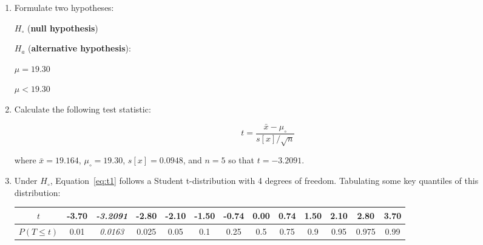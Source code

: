 \begin{enumerate}
\item  Formulate two hypotheses:\\

  \noindent\begin{minipage}{.4\textwidth}
    $H_\circ$ (\textbf{null hypothesis})
    
    \vspace{1em}
    
    $H_a$ (\textbf{alternative hypothesis}):
  \end{minipage}
  \begin{minipage}{.2\textwidth}
  \end{minipage}
  \begin{minipage}{.2\textwidth}
    $\mu=19.30$
    
    \vspace{1em}
    
    $\mu<{19.30}$
  \end{minipage}
  \begin{minipage}{.2\textwidth}
  \end{minipage}
  
\item Calculate the following test statistic:

  \begin{equation}
    t = \frac{\bar{x} - \mu_\circ}{s[x]/\sqrt{n}}
    \label{eq:t1}
  \end{equation}

  \noindent where $\bar{x} = 19.164$, $\mu_\circ = 19.30$, 
  $s[x] = 0.0948$, and $n = 5$ so that $t = -3.2091$.

\item Under $H_\circ$, Equation~\ref{eq:t1} follows a Student
  t-distribution with 4 degrees of freedom. Tabulating some key
  quantiles of this distribution:

  \begin{center}
    \begin{tabular}{c|c@{\gap}c@{\gap}c@{\gap}c@{\gap}
        c@{\gap}c@{\gap}c@{\gap}c@{\gap}c@{\gap}c@{\gap}c@{\gap}c}
      $t$ & -3.70 & \textit{-3.2091} & -2.80 & -2.10 & -1.50 & -0.74 &
      0.00 & 0.74 & 1.50 & 2.10 & 2.80 & 3.70 \\ \hline
      $P(T\leq{t})$ & 0.01 & \textit{0.0163} & 0.025 & 0.05 & 0.1 & 0.25 &
      0.5 & 0.75 & 0.9 & 0.95 & 0.975 & 0.99
    \end{tabular}
  \end{center}


\end{enumerate}
